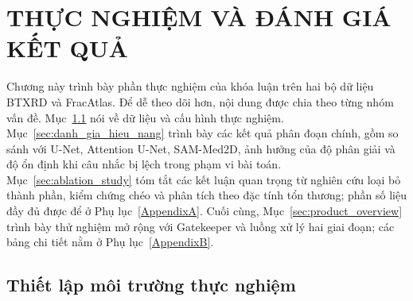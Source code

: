 \newcommand{\Ntest}{232}           %
\newcommand{\Ntestimg}{187}        %
\newcommand{\Ntrain}{1\,493}       %
\newcommand{\Nval}{187}            %

\newcommand{\NtestFA}{92}          %
\newcommand{\NtestimgFA}{72}       %
\newcommand{\NtrainFA}{730}        %
\newcommand{\NvalFA}{95}           %

\chapter{THỰC NGHIỆM VÀ ĐÁNH GIÁ KẾT QUẢ}
\label{Chapter4}

Chương này trình bày phần thực nghiệm của khóa luận trên hai bộ dữ liệu BTXRD và FracAtlas. Để dễ theo dõi hơn, nội dung được chia theo từng nhóm vấn đề. Mục~\ref{sec:thiet_lap} nói về dữ liệu và cấu hình thực nghiệm. Mục~\ref{sec:danh_gia_hieu_nang} trình bày các kết quả phân đoạn chính, gồm so sánh với U-Net, Attention U-Net, SAM-Med2D, ảnh hưởng của độ phân giải và độ ổn định khi câu nhắc bị lệch trong phạm vi bài toán. Mục~\ref{sec:ablation_study} tóm tắt các kết luận quan trọng từ nghiên cứu loại bỏ thành phần, kiểm chứng chéo và phân tích theo đặc tính tổn thương; phần số liệu đầy đủ được để ở Phụ lục~\ref{AppendixA}. Cuối cùng, Mục~\ref{sec:product_overview} trình bày thử nghiệm mở rộng với Gatekeeper và luồng xử lý hai giai đoạn; các bảng chi tiết nằm ở Phụ lục~\ref{AppendixB}.


\section{Thiết lập môi trường thực nghiệm}
\label{sec:thiet_lap}


